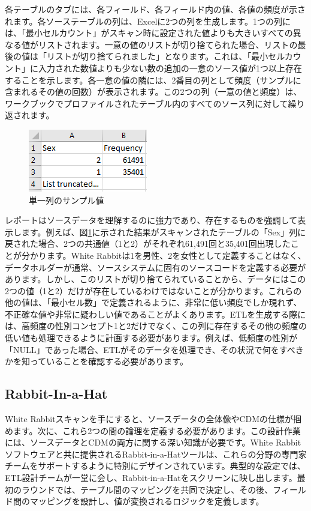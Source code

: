 \documentclass[
  11pt]{book}
\theoremstyle{definition}
\theoremstyle{definition}
\theoremstyle{definition}
\theoremstyle{definition}
\theoremstyle{remark}
\begin{document}
各テーブルのタブには、各フィールド、各フィールド内の値、各値の頻度が示されます。各ソーステーブルの列は、Excelに2つの列を生成します。1つの列には、「最小セルカウント」がスキャン時に設定された値よりも大きいすべての異なる値がリストされます。一意の値のリストが切り捨てられた場合、リストの最後の値は「リストが切り捨てられました」となります。これは、「最小セルカウント」に入力された数値よりも少ない数の追加の一意のソース値が1つ以上存在することを示します。各一意の値の隣には、2番目の列として頻度（サンプルに含まれるその値の回数）が表示されます。この2つの列（一意の値と頻度）は、ワークブックでプロファイルされたテーブル内のすべてのソース列に対して繰り返されます。

\begin{figure}

{\centering \includegraphics[width=0.3\linewidth]{images/ExtractTransformLoad/ScanSex} 

}

\caption{単一列のサンプル値}\label{fig:scanSex}
\end{figure}

レポートはソースデータを理解するのに強力であり、存在するものを強調して表示します。例えば、図\ref{fig:scanSex}に示された結果がスキャンされたテーブルの「Sex」列に戻された場合、2つの共通値（1と2）がそれぞれ61,491回と35,401回出現したことが分かります。White Rabbitは1を男性、2を女性として定義することはなく、データホルダーが通常、ソースシステムに固有のソースコードを定義する必要があります。しかし、このリストが切り捨てられていることから、データにはこの2つの値（1と2）だけが存在しているわけではないことが分かります。これらの他の値は、「最小セル数」で定義されるように、非常に低い頻度でしか現れず、不正確な値や非常に疑わしい値であることがよくあります。ETLを生成する際には、高頻度の性別コンセプト1と2だけでなく、この列に存在するその他の頻度の低い値も処理できるように計画する必要があります。例えば、低頻度の性別が「NULL」であった場合、ETLがそのデータを処理でき、その状況で何をすべきかを知っていることを確認する必要があります。

\subsection{Rabbit-In-a-Hat}\label{rabbit-in-a-hat}

White Rabbitスキャンを手にすると、ソースデータの全体像やCDMの仕様が掴めます。次に、これら2つの間の論理を定義する必要があります。この設計作業には、ソースデータとCDMの両方に関する深い知識が必要です。White Rabbitソフトウェアと共に提供されるRabbit-in-a-Hatツールは、これらの分野の専門家チームをサポートするように特別にデザインされています。典型的な設定では、ETL設計チームが一堂に会し、Rabbit-in-a-Hatをスクリーンに映し出します。最初のラウンドでは、テーブル間のマッピングを共同で決定し、その後、フィールド間のマッピングを設計し、値が変換されるロジックを定義します。 
\end{document}
